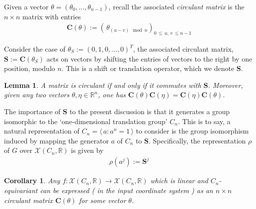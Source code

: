 \documentclass[12pt]{article}
\numberwithin{equation}{section}
\newtheorem{lem}[thm]{Lemma}
\newtheorem{coro}[thm]{Corollary}
\theoremstyle{definition}
\newcommand{		\R		}	{	\mathbb{R}				}
\newcommand{		\cX		}	{	\mathcal{X}				}
\newcommand{		\eq		}[1]	{	\begin{align*}#1\end{align*}	}%
\newcommand{		\ra		}	{	\rangle					}
\newcommand{		\la		}	{	\langle					}
\newcommand{		\1		}	{	\bm{1}					}%
\begin{document}
Given a vector $\theta = (\theta_0 , \dots, \theta_{n-1})$, recall the associated \emph{circulant matrix} is the $n \times n$ matrix with entries 
\eq{
\bm{C}(\theta) := \left( \, \theta_{ (u - v) \mod n} \right)_{ 0 \, \leq \,u,\,v \, \leq n-1 } 
}

Consider the case of $\theta_S := (0,1,0,\dots, 0)^T$, the associated circulant matrix, $\bm{S} := \bm{C}(\theta_S)$ acts on vectors by shifting the entries of vectors to the right by one position, modulo $n$. This is a shift or translation operator, which we denote $\bm{S}$. 

\begin{lem} A matrix is circulant if and only if it commutes with $\bm{S}$. Moreover, given any two vectors $\theta, \eta \in \mathbb{R}^n$, one has $\bm{C}(\theta) \bm{C}(\eta) = \bm{C}(\eta) \bm{C}(\theta)$. 
\end{lem}

The importance of $\bm{S}$ to the present discussion is that it generates a group isomorphic to the `one-dimensional translation group' $C_n$. This is to say, a natural representation of $C_n = \la \, a : a^n = 1 \, \ra$ to consider is the group isomorphism induced by mapping the generator $a$ of $C_n$ to $\bm{S}$. Specifically, the representation $\rho$ of $G$ over $\cX( C_n, \R)$ is given by
\eq{
\rho ( a^j ) := \bm{S}^j 
}


\begin{coro} Any $f : \cX(C_n, \R) \to \cX(C_n,\R)$ which is linear and $C_n$-equivariant can be expressed ( in the input coordinate system ) as an $n \times n$ circulant matrix $\bm{C}(\theta)$ for some vector $\theta$.  

\end{coro}
\end{document}
